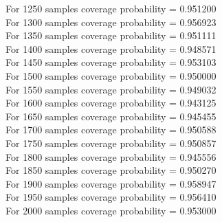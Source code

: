 \documentclass{article}
\begin{document}
For 1250 samples coverage probability = 0.951200\\
For 1300 samples coverage probability = 0.956923\\
For 1350 samples coverage probability = 0.951111\\
For 1400 samples coverage probability = 0.948571\\
For 1450 samples coverage probability = 0.953103\\
For 1500 samples coverage probability = 0.950000\\
For 1550 samples coverage probability = 0.949032\\
For 1600 samples coverage probability = 0.943125\\
For 1650 samples coverage probability = 0.945455\\
For 1700 samples coverage probability = 0.950588\\
For 1750 samples coverage probability = 0.950857\\
For 1800 samples coverage probability = 0.945556\\
For 1850 samples coverage probability = 0.950270\\
For 1900 samples coverage probability = 0.958947\\
For 1950 samples coverage probability = 0.956410\\
For 2000 samples coverage probability = 0.953000\\
\end{document}
